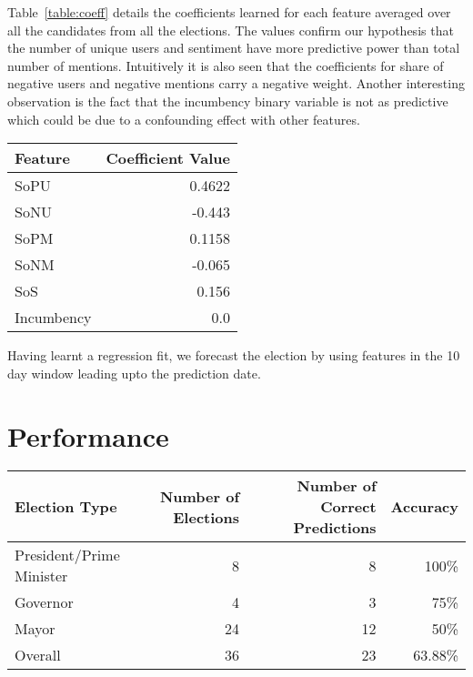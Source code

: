 Table~\ref{table:coeff} details the coefficients learned for each feature averaged over all the candidates from all the elections.
The values confirm our hypothesis that the number of unique users and sentiment have more predictive power than total number of mentions.
Intuitively it is also seen that the coefficients for share of negative users and negative mentions carry a negative weight.
Another interesting observation is the fact that the incumbency binary variable is not as predictive which could be
due to a confounding effect with other features. 
\begin{table*}
        \centering
        \begin{tabular}{|l|r|}
        \hline
        Feature & Coefficient Value\\
        \hline
        \textrm{SoPU} & 0.4622\\
        \textrm{SoNU} & -0.443\\
        \textrm{SoPM} &  0.1158\\
        \textrm{SoNM} &  -0.065\\
        \textrm{SoS} & 0.156\\
        \textrm{Incumbency} & 0.0\\
        \hline
        \end{tabular}
        \caption{Regression coefficients learned for features}
        \label{table:coeff}
\end{table*}
Having learnt a regression fit, we forecast the election
by using features in the 10 day window leading upto the prediction date.

\section{Performance}
\begin{table*}
        \centering
        \begin{tabular}{| l | r | r | r |}
        \hline
        Election Type & Number of Elections & Number of Correct Predictions & Accuracy\\
        \hline
        President/Prime Minister & 8 & 8 & 100\%\\
        Governor & 4 & 3 & 75\%\\
        Mayor & 24 & 12 & 50\%\\
        Overall & 36 & 23 & 63.88\%\\
        \hline
        \end{tabular}
        \caption{Track Record of Prediction Algorithms}
        \label{table:trackRecord}
\end{table*}

